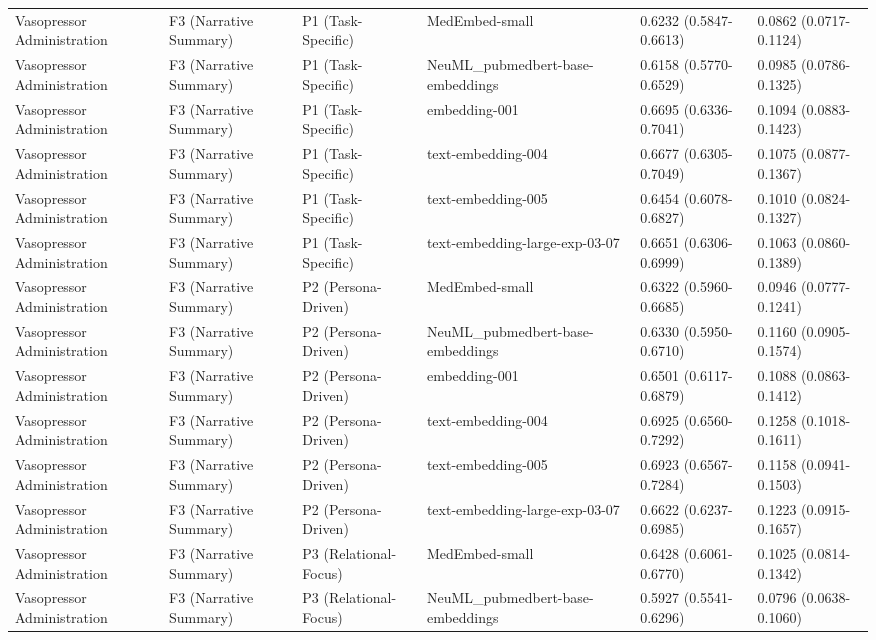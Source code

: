\documentclass[border=0pt]{standalone}
\begin{document}
\begin{adjustbox}{width=\textwidth}
\begin{tabular}{llllll}
Vasopressor Administration & F3 (Narrative Summary) & P1 (Task-Specific) & MedEmbed-small & 0.6232 (0.5847-0.6613) & 0.0862 (0.0717-0.1124) \\
Vasopressor Administration & F3 (Narrative Summary) & P1 (Task-Specific) & NeuML\_pubmedbert-base-embeddings & 0.6158 (0.5770-0.6529) & 0.0985 (0.0786-0.1325) \\
Vasopressor Administration & F3 (Narrative Summary) & P1 (Task-Specific) & embedding-001 & 0.6695 (0.6336-0.7041) & 0.1094 (0.0883-0.1423) \\
Vasopressor Administration & F3 (Narrative Summary) & P1 (Task-Specific) & text-embedding-004 & 0.6677 (0.6305-0.7049) & 0.1075 (0.0877-0.1367) \\
Vasopressor Administration & F3 (Narrative Summary) & P1 (Task-Specific) & text-embedding-005 & 0.6454 (0.6078-0.6827) & 0.1010 (0.0824-0.1327) \\
Vasopressor Administration & F3 (Narrative Summary) & P1 (Task-Specific) & text-embedding-large-exp-03-07 & 0.6651 (0.6306-0.6999) & 0.1063 (0.0860-0.1389) \\
Vasopressor Administration & F3 (Narrative Summary) & P2 (Persona-Driven) & MedEmbed-small & 0.6322 (0.5960-0.6685) & 0.0946 (0.0777-0.1241) \\
Vasopressor Administration & F3 (Narrative Summary) & P2 (Persona-Driven) & NeuML\_pubmedbert-base-embeddings & 0.6330 (0.5950-0.6710) & 0.1160 (0.0905-0.1574) \\
Vasopressor Administration & F3 (Narrative Summary) & P2 (Persona-Driven) & embedding-001 & 0.6501 (0.6117-0.6879) & 0.1088 (0.0863-0.1412) \\
Vasopressor Administration & F3 (Narrative Summary) & P2 (Persona-Driven) & text-embedding-004 & 0.6925 (0.6560-0.7292) & 0.1258 (0.1018-0.1611) \\
Vasopressor Administration & F3 (Narrative Summary) & P2 (Persona-Driven) & text-embedding-005 & 0.6923 (0.6567-0.7284) & 0.1158 (0.0941-0.1503) \\
Vasopressor Administration & F3 (Narrative Summary) & P2 (Persona-Driven) & text-embedding-large-exp-03-07 & 0.6622 (0.6237-0.6985) & 0.1223 (0.0915-0.1657) \\
Vasopressor Administration & F3 (Narrative Summary) & P3 (Relational-Focus) & MedEmbed-small & 0.6428 (0.6061-0.6770) & 0.1025 (0.0814-0.1342) \\
Vasopressor Administration & F3 (Narrative Summary) & P3 (Relational-Focus) & NeuML\_pubmedbert-base-embeddings & 0.5927 (0.5541-0.6296) & 0.0796 (0.0638-0.1060) \\

\end{tabular}
\end{adjustbox}
\end{document}
